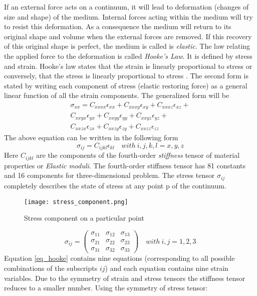 \begin{doublespacing}
If an external force acts on a continuum, it will lead to deformation (changes of size and shape) of the medium. Internal forces acting within the medium will try to resist this deformation. As a consequence the  medium will return to its original shape and volume when the external forces are removed. If this recovery of this original shape is perfect, the medium is called is \textit{elastic}. The law relating the applied force to the deformation is called \textit{Hooke's Law}. It is defined by stress and strain. Hooke's law states that the strain is linearly proportional to stress or conversely, that the stress is linearly proportional to stress \cite{auld1973acoustic}. The second form is stated by writing each component of stress (elastic restoring force) as a general linear function of all the strain components. The generalized form will be 
\begin{multline}
\sigma_{xx}=C_{xxxx}\epsilon_{xx} + C_{xxxy}\epsilon_{xy} +  C_{xxxz}\epsilon_{xz}+\\ C_{xxyx}\epsilon_{yx}+ C_{xxyy}\epsilon_{yy}+C_{xxyz}\epsilon_{yz}+\\ C_{xxzx}\epsilon_{zx}+C_{xxzy}\epsilon_{zy}+C_{xxzz}\epsilon_{zz}
\end{multline}
The above equation can be written in the following form
\begin{equation}
\label{eq_hooke}
\sigma_{ij}=C_{ijkl}\epsilon_{kl} \quad with \  i,j,k,l = x,y,z
\end{equation}
Here $C_{ijkl}$ are the components of the fourth-order \textit{stiffness} tensor of material properties or \textit{Elastic moduli}. The fourth-order stiffness tensor has 81 constants and 16 components for three-dimensional problem. The stress tensor $\sigma_{ij}$ completely describes the state of stress at any point p of the continuum.
\begin{figure}[H]
\centering
\texttt{[image: stress\_component.png]}
\caption{Stress component on a particular point}
\label{fig:my_label}
\end{figure}
\begin{equation}
\sigma_{ij} = \left ( \begin{array}{ccc}
 \sigma_{11}& \sigma_{12} & \sigma_{13}  \\
 \sigma_{21}& \sigma_{22} & \sigma_{23} \\
 \sigma_{31}& \sigma_{32} & \sigma_{33}
\end{array}\right ) \quad with \ i,j = 1,2,3
\end{equation}
Equation \ref{eq_hooke} contains nine equations (corresponding to all possible combinations of the subscripts $ij$) and each equation contains nine strain variables. Due to the symmetry of strain and stress tensors the stiffness tensor reduces to a smaller number. Using the symmetry of stress tensor:

\end{doublespacing}
